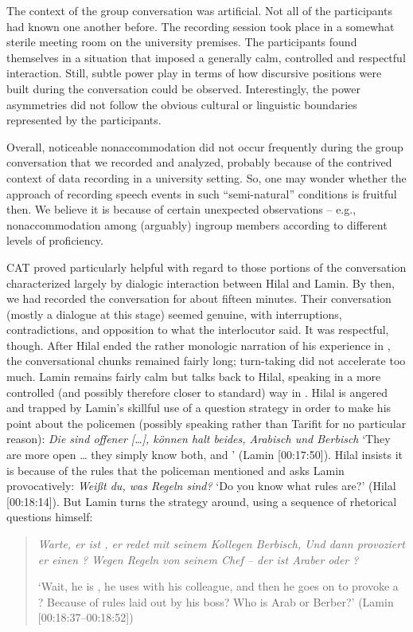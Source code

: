 \documentclass[output=paper,colorlinks,citecolor=brown]{langscibook}
\begin{document}
The context of the group conversation was artificial. Not all of the participants had known one another before. The recording session took place in a somewhat sterile meeting room on the university premises. The participants found themselves in a situation that imposed a generally calm, controlled and respectful interaction. Still, subtle power play in terms of how discursive positions were built during the conversation could be observed. Interestingly, the power asymmetries did not follow the obvious cultural or linguistic boundaries represented by the participants.

Overall, noticeable nonaccommodation did not occur frequently during the group conversation that we recorded and analyzed, probably because of the contrived context of data recording in a university setting. So, one may wonder whether the approach of recording speech events in such ``semi-natural'' conditions is fruitful then. We believe it is because of certain unexpected observations -- e.g., nonaccommodation among (arguably) ingroup members according to different levels of proficiency. 

CAT proved particularly helpful with regard to those portions of the conversation characterized largely by dialogic interaction between Hilal and Lamin. By then, we had recorded the conversation for about fifteen minutes. Their conversation (mostly a dialogue at this stage) seemed genuine, with interruptions, contradictions, and opposition to what the interlocutor said. It was respectful, though. After Hilal ended the rather monologic narration of his experience in , the conversational chunks remained fairly long; turn-taking did not accelerate too much. Lamin remains fairly calm but talks back to Hilal, speaking in a more controlled (and possibly therefore closer to standard) way in . Hilal is angered and trapped by Lamin's skillful use of a question strategy in order to make his point about the policemen (possibly speaking  rather than Tarifit for no particular reason): \textit{Die sind offener […], können halt beides, Arabisch und Berbisch} `They are more open … they simply know both,  and ' (Lamin [00:17:50]). Hilal insists it is because of the rules that the policeman mentioned and asks Lamin provocatively: \textit{Weißt du, was Regeln sind?} `Do you know what rules are?' (Hilal [00:18:14]). But Lamin turns the strategy around, using a sequence of rhetorical questions himself: 
\begin{quote}
\textit{Warte, er ist , er redet mit seinem Kollegen Berbisch, Und dann provoziert er einen ? Wegen Regeln von seinem Chef -- der ist Araber oder ?}

`Wait, he is , he uses  with his colleague, and then he goes on to provoke a ? Because of rules laid out by his boss? Who is Arab or Berber?' (Lamin [00:18:37--00:18:52]) 
\end{quote}
\end{document}
